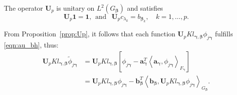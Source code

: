 \documentclass[11pt]{article}
\newcommand{\vect}[1]{\boldsymbol{#1}}
\newcommand{\inner}[1]{\left\langle #1 \right\rangle}
\newcommand{\phj}{\phi_{j\vect{\gamma}}}
\newcommand{\tphj}{\widetilde{\phi}_{j\vect{\gamma}}}
\newcommand{\hj}{h_{j\vect{\beta}}}
\newcommand{\thj}{\widetilde{h}_{j\vect{\beta}}}
\begin{document}
\begin{prop} \label{prop:Up}
The operator $\vect{U}_p$ is unitary on $L^2\left(G_{\vect{\beta}}\right)$ and satisfies
$$
\vect{U}_p\vect{1}=\vect{1},
\ \ \text {and } \ \  \vect{U}_{p}c_{\lambda_k} = b_{\vect{\beta}_k}, \quad k=1,\dots,p. $$
\end{prop} 
From Proposition~\ref{prop:Up}, it follows that each function $\vect{U}_{p}K l_{\vect{\gamma},\vect{\beta}} \phj$ fulfills \eqref{eqn:au_bh}, thus:
\begin{equation*}
\begin{aligned}
\vect{U}_{p}Kl_{\vect{\gamma},\vect{\beta}} \tphj&= \vect{U}_{p} Kl_{\vect{\gamma},\vect{\beta}}\left[\phj-\vect{a}^T_{\vect{\gamma}}\inner{\vect{a}_{\vect{\gamma}}, \phj}_{F_{\vect{\gamma}}}\right]  \\
&=\vect{U}_{p}K l_{\vect{\gamma},\vect{\beta}} \phj-\vect{b}^T_{\vect{\beta}}\inner{\vect{b}_{\vect{\beta}}, \vect{U}_{p}K l_{\vect{\gamma},\vect{\beta}} \phj}_{G_{\vect{\beta}}}. 
\end{aligned}
\end{equation*}
\end{document}
